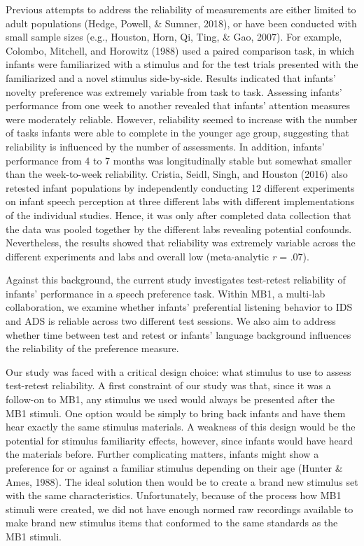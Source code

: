 \documentclass[
  man,floatsintext]{apa6}
\begin{document}
Previous attempts to address the reliability of measurements are either limited to adult populations (Hedge, Powell, \& Sumner, 2018), or have been conducted with small sample sizes (e.g., Houston, Horn, Qi, Ting, \& Gao, 2007).
For example, Colombo, Mitchell, and Horowitz (1988) used a paired comparison task, in which infants were familiarized with a stimulus and for the test trials presented with the familiarized and a novel stimulus side-by-side.
Results indicated that infants' novelty preference was extremely variable from task to task.
Assessing infants' performance from one week to another revealed that infants' attention measures were moderately reliable.
However, reliability seemed to increase with the number of tasks infants were able to complete in the younger age group, suggesting that reliability is influenced by the number of assessments.
In addition, infants' performance from 4 to 7 months was longitudinally stable but somewhat smaller than the week-to-week reliability.
Cristia, Seidl, Singh, and Houston (2016) also retested infant populations by independently conducting 12 different experiments on infant speech perception at three different labs with different implementations of the individual studies.
Hence, it was only after completed data collection that the data was pooled together by the different labs revealing potential confounds.
Nevertheless, the results showed that reliability was extremely variable across the different experiments and labs and overall low (meta-analytic \emph{r} = .07).

Against this background, the current study investigates test-retest reliability of infants' performance in a speech preference task.
Within MB1, a multi-lab collaboration, we examine whether infants' preferential listening behavior to IDS and ADS is reliable across two different test sessions.
We also aim to address whether time between test and retest or infants' language background influences the reliability of the preference measure.

Our study was faced with a critical design choice: what stimulus to use to assess test-retest reliability.
A first constraint of our study was that, since it was a follow-on to MB1, any stimulus we used would always be presented after the MB1 stimuli.
One option would be simply to bring back infants and have them hear exactly the same stimulus materials.
A weakness of this design would be the potential for stimulus familiarity effects, however, since infants would have heard the materials before.
Further complicating matters, infants might show a preference for or against a familiar stimulus depending on their age (Hunter \& Ames, 1988).
The ideal solution then would be to create a brand new stimulus set with the same characteristics.
Unfortunately, because of the process how MB1 stimuli were created, we did not have enough normed raw recordings available to make brand new stimulus items that conformed to the same standards as the MB1 stimuli.
\end{document}
